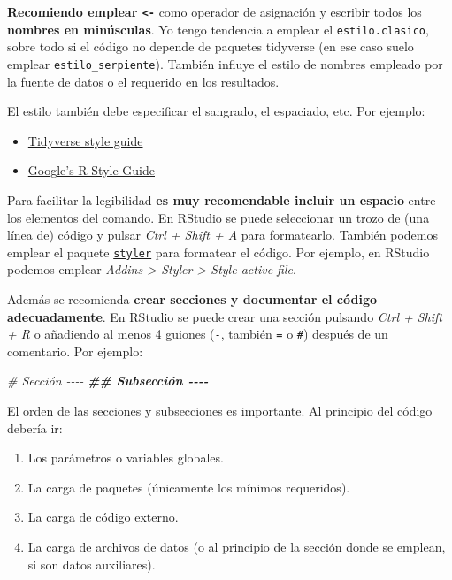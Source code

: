 \documentclass[
]{book}
\newenvironment{Shaded}{\begin{snugshade}}{\end{snugshade}}
\newcommand{\CommentTok}[1]{\textcolor[rgb]{0.56,0.35,0.01}{\textit{#1}}}
\newcommand{\DocumentationTok}[1]{\textcolor[rgb]{0.56,0.35,0.01}{\textbf{\textit{#1}}}}
\providecommand{\tightlist}{%
  \setlength{\itemsep}{0pt}\setlength{\parskip}{0pt}}
\theoremstyle{break}
\theoremstyle{nonumberplain}
\begin{document}
\textbf{Recomiendo emplear \texttt{\textless{}-}} como operador de asignación y escribir todos los \textbf{nombres en minúsculas}.
Yo tengo tendencia a emplear el \texttt{estilo.clasico}, sobre todo si el código no depende de paquetes tidyverse (en ese caso suelo emplear \texttt{estilo\_serpiente}).
También influye el estilo de nombres empleado por la fuente de datos o el requerido en los resultados.

El estilo también debe especificar el sangrado, el espaciado, etc.
Por ejemplo:

\begin{itemize}
\item
  \href{https://style.tidyverse.org}{Tidyverse style guide}
\item
  \href{https://google.github.io/styleguide/Rguide.html}{Google's R Style Guide}
\end{itemize}

Para facilitar la legibilidad \textbf{es muy recomendable incluir un espacio} entre los elementos del comando.
En RStudio se puede seleccionar un trozo de (una línea de) código y pulsar \emph{Ctrl + Shift + A} para formatearlo.
También podemos emplear el paquete \href{https://github.com/r-lib/styler}{\texttt{styler}} para formatear el código.
Por ejemplo, en RStudio podemos emplear \emph{Addins \textgreater{} Styler \textgreater{} Style active file}.

Además se recomienda \textbf{crear secciones y documentar el código adecuadamente}.
En RStudio se puede crear una sección pulsando \emph{Ctrl + Shift + R} o añadiendo al menos 4 guiones (\texttt{-}, también \texttt{=} o \texttt{\#}) después de un comentario.
Por ejemplo:

\begin{Shaded}
\begin{Highlighting}[]
\CommentTok{\# Sección {-}{-}{-}{-}}
\DocumentationTok{\#\# Subsección {-}{-}{-}{-}}
\end{Highlighting}
\end{Shaded}

El orden de las secciones y subsecciones es importante.
Al principio del código debería ir:

\begin{enumerate}
\def\labelenumi{\arabic{enumi}.}
\tightlist
\item
  Los parámetros o variables globales.
\item
  La carga de paquetes (únicamente los mínimos requeridos).
\item
  La carga de código externo.
\item
  La carga de archivos de datos (o al principio de la sección donde se emplean, si son datos auxiliares).
\end{enumerate}
\end{document}
